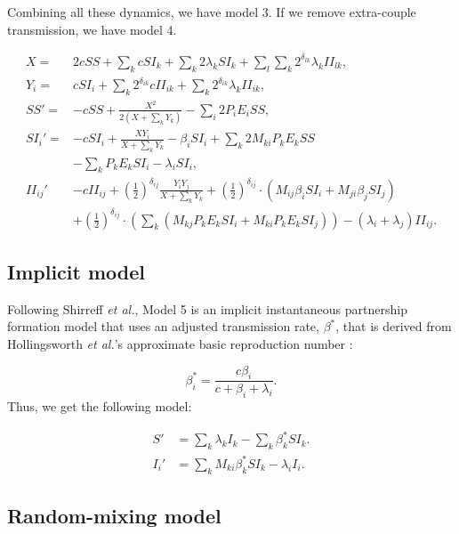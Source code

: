 \documentclass[10pt,letterpaper]{article}
\newcommand{\khalf}{\left(\frac{1}{2}\right)^{\delta_{ij}}}  %
\newcommand{\etal}{\textit{et al.}}
\begin{document}
Combining all these dynamics, we have model 3. If we remove extra-couple transmission, we have model 4.

\begin{equation}
\begin{aligned}
X =& 2 c SS + \sum_k c SI_k + \sum_k 2 \lambda_k SI_k + \sum_l \sum_k 2^{\delta_{lk}}  \lambda_k II_{lk},\\
Y_i =& c SI_i + \sum_k 2^{\delta_{ik}}  c II_{ik} + \sum_k  2^{\delta_{ik}}  \lambda_k II_{ik}, \\
SS'  =& - c SS + \frac{X^2}{2 (X + \sum_k Y_k)}  - \sum_i 2 P_i E_i SS,\\
SI_i' =& - c SI_i + \frac{X Y_i}{X + \sum_k Y_k} - \beta_i SI_i + \sum_k 2 M_{ki} P_k E_k SS\\
&- \sum_k P_k E_k SI_i - \lambda_i SI_i,\\
II_{ij}'& - c II_{ij} +\khalf \frac{Y_i Y_j}{X + \sum_k Y_k} + \khalf \cdot (M_{ij} \beta_i SI_i + M_{ji} \beta_j SI_j)\\
&+ \khalf \cdot (\sum_k (M_{kj} P_k E_k SI_i + M_{ki} P_k E_k SI_j)) -(\lambda_i + \lambda_j) II_{ij}.
\end{aligned}
\end{equation}

\subsection*{Implicit model}

Following Shirreff \etal \cite{shirreff_transmission_2011}, Model 5 is an implicit instantaneous partnership formation model that uses an adjusted transmission rate, $\beta^\ast$, that is derived from Hollingsworth \etal's approximate basic reproduction number \cite{hollingsworth_hiv1_2008}:

\begin{equation}
\beta^\ast_i = \frac{c \beta_i}{c + \beta_i + \lambda_i}.
\end{equation}
Thus, we get the following model:

\begin{equation}
\begin{aligned}
S' & = \sum_k \lambda_k I_k - \sum_k \beta^\ast_k S I_k.\\
I_i' & = \sum_k M_{ki} \beta^\ast_k S I_k - \lambda_i I_i.
\end{aligned}
\end{equation}

\subsection*{Random-mixing model}
\end{document}
